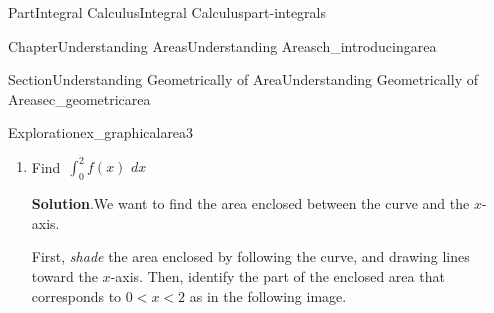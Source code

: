 \documentclass[oneside,10pt,]{tufte-book}
\newcommand{\blocktitlefont}{\relax}
\numberwithin{equation}{chapter}
\newcommand{\intdx}[1]{{\,\int#1\,\,dx}}
\newcommand{\lt}{<}
\begin{document}
\begin{partptx}{Part}{Integral Calculus}{}{Integral Calculus}{}{}{part-integrals}
\begin{chapterptx}{Chapter}{Understanding Areas}{}{Understanding Areas}{}{}{ch_introducingarea}
\begin{sectionptx}{Section}{Understanding Geometrically of Area}{}{Understanding Geometrically of Area}{}{}{sec_geometricarea}
\begin{exploration}{Exploration}{}{ex_graphicalarea3}
\begin{enumerate}[font=\bfseries,label=(\alph*),ref=\alph*]
\begin{image}{0.25}{0.5}{0.25}{}
{
}%
\end{image}%
The shaded area is a triangle with base \(b=1\) and height \(h=1\). The region enclosed is \emph{above} the \(x\)-axis so it has \emph{positive} net area. Putting this together,%
\begin{equation*}
\intdx{_0^1 f(x) } = (+) \frac{1}{2}\cdot 1 \cdot 1 = 0.5
\end{equation*}
%
\item{}Find \(\intdx{_0^2 f(x) }\)%
\par\smallskip%
\noindent\textbf{\blocktitlefont Solution}.\hypertarget{ex_graphicalarea3-3-2}{}\quad{}We want to find the area enclosed between the curve and the \(x\)-axis.%
\par
First, \emph{shade} the area enclosed by following the curve, and drawing lines toward the \(x\)-axis. Then, identify the part of the enclosed area that corresponds to \(0\lt x \lt 2\) as in the following image.%
\begin{image}{0.25}{0.5}{0.25}{}%
\end{image}
\end{enumerate}
\end{exploration}
\end{sectionptx}
\end{chapterptx}
\end{partptx}
\end{document}
